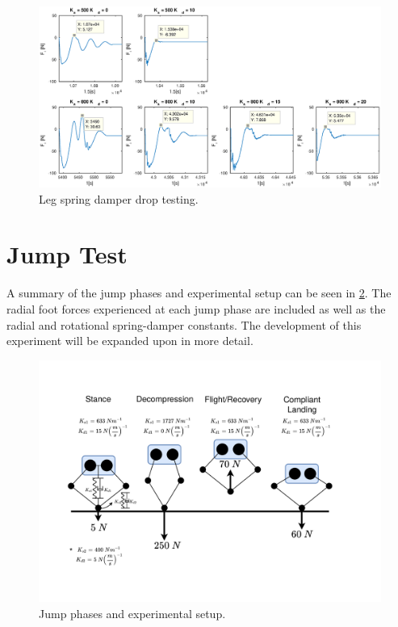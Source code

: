 \begin{figure}
\centering
\includegraphics[width=1\textwidth]{images/experiments/drop-test-force-plots.eps} 
\caption{Leg spring damper drop testing.}
\label{fig:drop-tests}
\end{figure}

\section{Jump Test}
\label{sec:Jump Test}

A summary of the jump phases and experimental setup can be seen in \cref{fig:jump-phases-experiment}. The radial foot forces experienced at each jump phase are included as well as the radial and rotational spring-damper constants. The development of this experiment will be expanded upon in more detail.

\begin{figure}
\centering
\includegraphics[clip, trim = 2.5cm 2cm 4cm 2cm, width=1\textwidth]{images/experiments/jump/jump-phases.pdf} 
\caption{Jump phases and experimental setup.}
\label{fig:jump-phases-experiment}
\end{figure}

